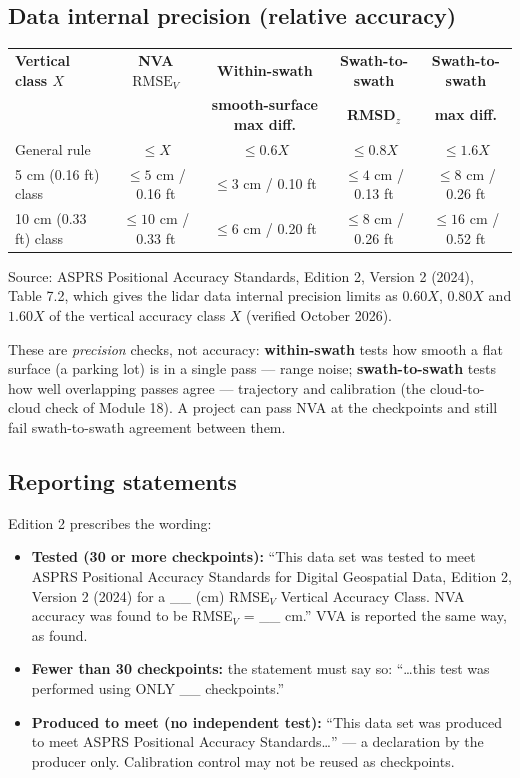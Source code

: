 \subsection{Data internal precision (relative accuracy)}
\begin{center}\small
\renewcommand{\arraystretch}{1.2}
\begin{tabular}{lcccc}\toprule
\textbf{Vertical class $X$} & \textbf{NVA $\text{RMSE}_V$} & \textbf{Within-swath} & \textbf{Swath-to-swath} & \textbf{Swath-to-swath}\\
 & & \textbf{smooth-surface max diff.} & \textbf{RMSD$_z$} & \textbf{max diff.}\\\midrule
General rule & $\le X$ & $\le0.6X$ & $\le0.8X$ & $\le1.6X$\\
5 cm (0.16 ft) class & $\le5$ cm / 0.16 ft & $\le3$ cm / 0.10 ft & $\le4$ cm / 0.13 ft & $\le8$ cm / 0.26 ft\\
10 cm (0.33 ft) class & $\le10$ cm / 0.33 ft & $\le6$ cm / 0.20 ft & $\le8$ cm / 0.26 ft & $\le16$ cm / 0.52 ft\\\bottomrule
\end{tabular}\end{center}
{\footnotesize Source: ASPRS Positional Accuracy Standards, Edition 2, Version 2 (2024), Table 7.2, which gives the lidar data internal precision limits as $0.60X$, $0.80X$ and $1.60X$ of the vertical accuracy class $X$ (verified October 2026).}

These are \emph{precision} checks, not accuracy: \textbf{within-swath} tests how smooth a flat surface (a parking lot) is in a single pass --- range noise; \textbf{swath-to-swath} tests how well overlapping passes agree --- trajectory and calibration (the cloud-to-cloud check of Module 18). A project can pass NVA at the checkpoints and still fail swath-to-swath agreement between them.

\subsection{Reporting statements}
\begin{eng}
Edition 2 prescribes the wording:
\begin{itemize}
\item \textbf{Tested (30 or more checkpoints):} ``This data set was tested to meet ASPRS Positional Accuracy Standards for Digital Geospatial Data, Edition 2, Version 2 (2024) for a \_\_ (cm) RMSE$_V$ Vertical Accuracy Class. NVA accuracy was found to be RMSE$_V$ = \_\_ cm.'' VVA is reported the same way, as found.
\item \textbf{Fewer than 30 checkpoints:} the statement must say so: ``\ldots this test was performed using ONLY \_\_ checkpoints.''
\item \textbf{Produced to meet (no independent test):} ``This data set was produced to meet ASPRS Positional Accuracy Standards\ldots'' --- a declaration by the producer only. Calibration control may not be reused as checkpoints.
\end{itemize}
\end{eng}

